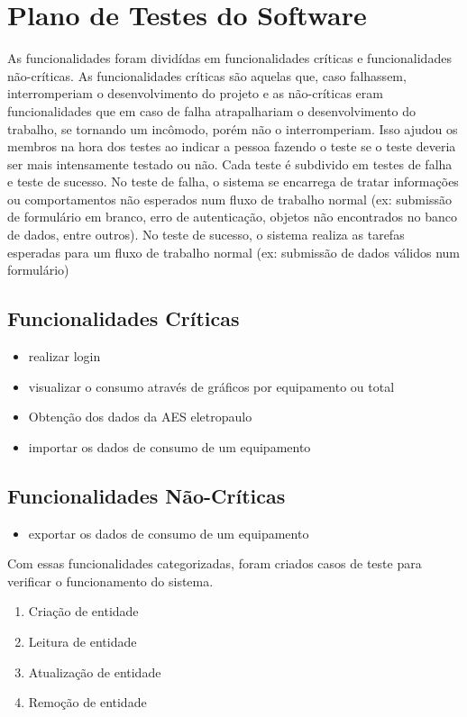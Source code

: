 \section{Plano de Testes do Software}
\label{Sec:6-software}

As funcionalidades foram dividídas em funcionalidades críticas e funcionalidades não-críticas. As funcionalidades críticas são aquelas que, caso falhassem, interromperiam o desenvolvimento do projeto e as não-críticas eram funcionalidades que em caso de falha atrapalhariam o desenvolvimento do trabalho, se tornando um incômodo, porém não o interromperiam. Isso ajudou os membros na hora dos testes ao indicar a pessoa fazendo o teste se o teste deveria ser mais intensamente testado ou não. Cada teste é subdivido em testes de falha e teste de sucesso. No teste de falha, o sistema se encarrega de tratar informações ou comportamentos não esperados num fluxo de trabalho normal (ex: submissão de formulário em branco, erro de autenticação, objetos não encontrados no banco de dados, entre outros). No teste de sucesso, o sistema realiza as tarefas esperadas para um fluxo de trabalho normal (ex: submissão de dados válidos num formulário)

\subsection{Funcionalidades Críticas}
\begin{itemize}
\item{realizar login}
\item{visualizar o consumo através de gráficos por equipamento ou total}
\item{Obtenção dos dados da AES eletropaulo}
\item{importar os dados de consumo de um equipamento}
\end{itemize}

\subsection{Funcionalidades Não-Críticas}
\begin{itemize}
\item{exportar os dados de consumo de um equipamento}
\end{itemize}

Com essas funcionalidades categorizadas, foram criados casos de teste para verificar o funcionamento do sistema.

\begin{enumerate}
\item{
  Criação de entidade
}
\item{Leitura de entidade}
\item{Atualização de entidade}
\item{Remoção de entidade}

\end{enumerate}


